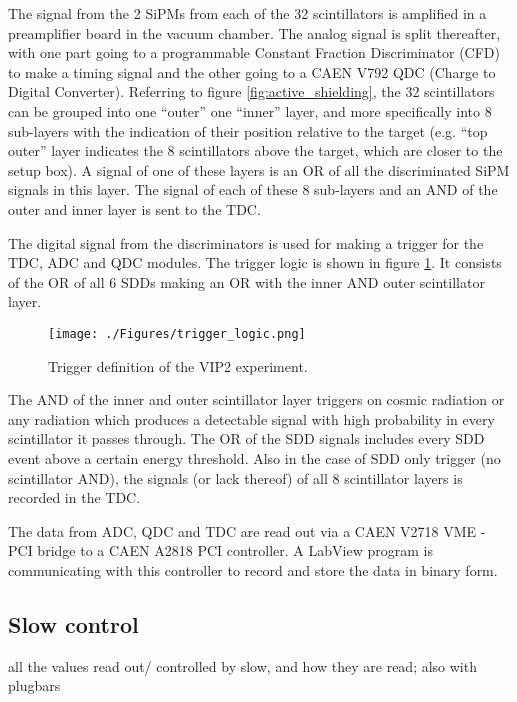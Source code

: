 The signal from the 2 SiPMs from each of the 32 scintillators is amplified in a preamplifier board in the vacuum chamber. The analog signal is split thereafter, with one part going to a programmable Constant Fraction Discriminator (CFD) to make a timing signal and the other going to a CAEN V792 QDC (Charge to Digital Converter). Referring to figure \ref{fig:active_shielding}, the 32 scintillators can be grouped into one ``outer'' one ``inner'' layer, and more specifically into 8 sub-layers with the indication of their position relative to the target (e.g. ``top outer'' layer indicates the 8 scintillators above the target, which are closer to the setup box). A signal of one of these layers is an OR of all the discriminated SiPM signals in this layer. The signal of each of these 8 sub-layers and an AND of the outer and inner layer is sent to the TDC.

The digital signal from the discriminators is used for making a trigger for the TDC, ADC and QDC modules. The trigger logic is shown in figure \ref{fig:trigger_logic}. It consists of the OR of all 6 SDDs making an OR with the inner AND outer scintillator layer.
\begin{figure}[h]
 \centering
 \texttt{[image: ./Figures/trigger\_logic.png]}
 \caption{Trigger definition of the VIP2 experiment.}
 \label{fig:trigger_logic}
\end{figure}
The AND of the inner and outer scintillator layer triggers on cosmic radiation or any radiation which produces a detectable signal with high probability in every scintillator it passes through. The OR of the SDD signals includes every SDD event above a certain energy threshold. Also in the case of SDD only trigger (no scintillator AND), the signals (or lack thereof) of all 8 scintillator layers is recorded in the TDC.

The data from ADC, QDC and TDC are read out via a CAEN V2718 VME - PCI bridge to a CAEN A2818 PCI controller. A LabView program is communicating with this controller to record and store the data in binary form. 


\subsection{Slow control}
\label{sec:slowControl}
all the values read out/ controlled by slow, and how they are read; also with plugbars

